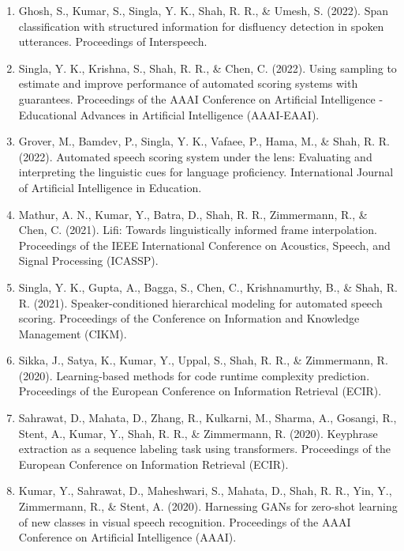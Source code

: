 \begin{enumerate}
    \item Ghosh, S., Kumar, S., Singla, Y. K., Shah, R. R., \& Umesh, S. (2022). Span classification with structured information for disfluency detection in spoken utterances. Proceedings of Interspeech.

    \item Singla, Y. K., Krishna, S., Shah, R. R., \& Chen, C. (2022). Using sampling to estimate and improve performance of automated scoring systems with guarantees. Proceedings of the AAAI Conference on Artificial Intelligence - Educational Advances in Artificial Intelligence (AAAI-EAAI).

    \item Grover, M., Bamdev, P., Singla, Y. K., Vafaee, P., Hama, M., \& Shah, R. R. (2022). Automated speech scoring system under the lens: Evaluating and interpreting the linguistic cues for language proficiency. International Journal of Artificial Intelligence in Education.

    \item Mathur, A. N., Kumar, Y., Batra, D., Shah, R. R., Zimmermann, R., \& Chen, C. (2021). Lifi: Towards linguistically informed frame interpolation. Proceedings of the IEEE International Conference on Acoustics, Speech, and Signal Processing (ICASSP).

    \item Singla, Y. K., Gupta, A., Bagga, S., Chen, C., Krishnamurthy, B., \& Shah, R. R. (2021). Speaker-conditioned hierarchical modeling for automated speech scoring. Proceedings of the Conference on Information and Knowledge Management (CIKM).

    \item Sikka, J., Satya, K., Kumar, Y., Uppal, S., Shah, R. R., \& Zimmermann, R. (2020). Learning-based methods for code runtime complexity prediction. Proceedings of the European Conference on Information Retrieval (ECIR).

    \item Sahrawat, D., Mahata, D., Zhang, R., Kulkarni, M., Sharma, A., Gosangi, R., Stent, A., Kumar, Y., Shah, R. R., \& Zimmermann, R. (2020). Keyphrase extraction as a sequence labeling task using transformers. Proceedings of the European Conference on Information Retrieval (ECIR).

    \item Kumar, Y., Sahrawat, D., Maheshwari, S., Mahata, D., Shah, R. R., Yin, Y., Zimmermann, R., \& Stent, A. (2020). Harnessing GANs for zero-shot learning of new classes in visual speech recognition. Proceedings of the AAAI Conference on Artificial Intelligence (AAAI).


\end{enumerate}
